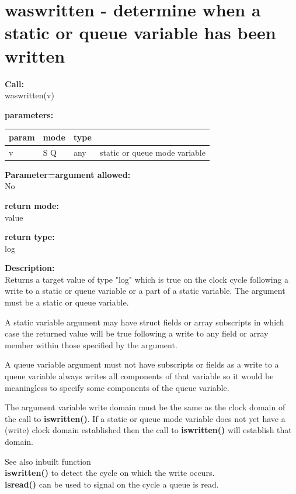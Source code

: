     \section{waswritten - determine when a static or queue variable has been written}\label{sec:ifwaswritten}
        
        {\bf Call:} \\
        waswritten(v)
        
        {\bf parameters:} \\
        \begin{tabular}{| l | l | l | l |}
        \hline
        param  & mode & type & \\
        \hline \hline
        v & S Q & any & static or queue mode variable \\ \hline
        \end{tabular}
        
        {\bf Parameter=argument allowed:} \\
        No
        
        {\bf return mode:} \\
        value

        {\bf return type:} \\
        log
        
        {\bf Description:} \\
        Returns a target value of type "log" which is true on the clock
        cycle following a write to a static or queue variable or a part
        of a static variable. The argument must be a static or queue variable.
        
        A static variable argument may have struct fields or array subscripts in
        which case the returned value will be true following a write to any
        field or array member within those specified by the argument.
        
        A queue variable argument must not have subscripts or fields as a write
        to a queue variable always writes all components of that variable so
        it would be meaningless to specify some components of the queue variable.
        
        The argument variable write domain must be the same as the clock domain
        of the call to {\bf iswritten()}. If a static or queue mode variable does
        not yet have a (write) clock domain established then the call to
        {\bf iswritten()} will establish that domain.

        See also inbuilt function \\
        {\bf iswritten()} 
        to detect the cycle on which the write occurs. \\
        {\bf isread()}  can be used to signal on the
        cycle a queue is read.




